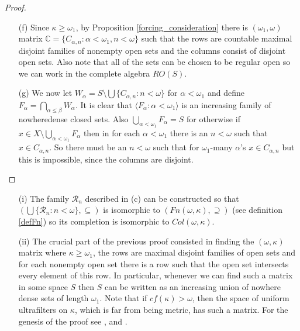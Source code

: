 \begin{proof}
\begin{itemize}
\item[(f)]  Since $\kappa\geq\omega_1$, by Proposition \ref{forcing_consideration}
there is $(\omega_1,\omega)$ matrix ${\mathbb C}=\{C_{\alpha,n}:\alpha<\omega_1,n<\omega\}$ such that the rows are countable maximal disjoint families of nonempty open sets and the columns consist of disjoint open sets. Also note that all of the sets can be chosen to be regular open so we can work in the complete algebra $RO(S)$.

\item[(g)]  We now let $W_\alpha= S\setminus\bigcup\{C_{\alpha,n}:n<\omega\}$ for $\alpha<\omega_1$ and define $F_\alpha=\bigcap_{\alpha\leq\beta}W_\alpha$.
It is clear that $\langle F_\alpha:\alpha<\omega_1\rangle$ is an increasing family of nowheredense closed sets. Also $\bigcup_{\alpha<\omega_1}F_\alpha=S$ for otherwise
if $x\in X\setminus \bigcup_{\alpha<\omega_1}F_\alpha$ then in for each $\alpha<\omega_1$ there is an $n<\omega$ such that $x\in C_{\alpha,n}$. So there must
be an $n<\omega$ such that for $\omega_1$-many $\alpha$'s $x\in C_{\alpha,n}$ but this is impossible, since the columns are disjoint.
\end{itemize}
\end{proof}

\begin{note}
\begin{itemize}
 \item[]
 \item[(i)] The family $\mathcal{R}_n$ described in (c) can be constructed so that $(\bigcup \{\mathcal{R}_n:n<\omega\},\subseteq)$ is isomorphic to
  $(Fn(\omega,\kappa),\supseteq)$ (see definition \ref{defFn}) so its completion is isomorphic to $Col(\omega,\kappa)$.
 \item[(ii)]The crucial part of the previous proof consisted in finding the $(\omega,\kappa)$ matrix where $\kappa\geq\omega_1$, the rows are maximal disjoint families of open sets and for each nonempty open set there is a row such that the open set intersects every element of this row. In particular, whenever we can find such a matrix in some space $S$ then $S$ can be written as an increasing union of nowhere dense sets of length $\omega_1$. Note that if $cf(\kappa)>\omega$, then the space
of uniform ultrafilters on $\kappa$, which is far from being metric, has such a matrix. For the genesis of the proof see \cite{BV:ad-sets}, \cite{BS:baire} and
\cite{Sh:pw-modsmall}.
\end{itemize}
\end{note}

